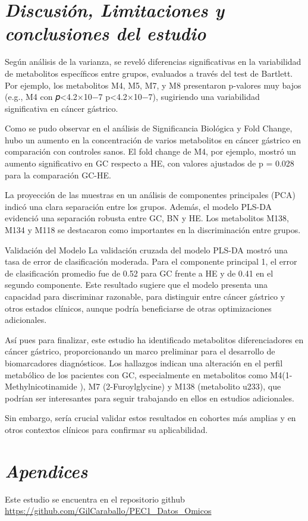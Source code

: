 \documentclass[
]{article}
\begin{document}
\section{\texorpdfstring{\emph{Discusión, Limitaciones y conclusiones
del
estudio}}{Discusión, Limitaciones y conclusiones del estudio}}\label{discusiuxf3n-limitaciones-y-conclusiones-del-estudio}

Según análisis de la varianza, se reveló diferencias significativas en
la variabilidad de metabolitos específicos entre grupos, evaluados a
través del test de Bartlett. Por ejemplo, los metabolitos M4, M5, M7, y
M8 presentaron p-valores muy bajos (e.g., M4 con 𝑝\textless4.2×10−7
p\textless4.2×10−7), sugiriendo una variabilidad significativa en cáncer
gástrico.

Como se pudo observar en el análisis de Significancia Biológica y Fold
Change, hubo un aumento en la concentración de varios metabolitos en
cáncer gástrico en comparación con controles sanos. El fold change de
M4, por ejemplo, mostró un aumento significativo en GC respecto a HE,
con valores ajustados de p = 0.028 para la comparación GC-HE.

La proyección de las muestras en un análisis de componentes principales
(PCA) indicó una clara separación entre los grupos. Además, el modelo
PLS-DA evidenció una separación robusta entre GC, BN y HE. Los
metabolitos M138, M134 y M118 se destacaron como importantes en la
discriminación entre grupos.

Validación del Modelo La validación cruzada del modelo PLS-DA mostró una
tasa de error de clasificación moderada. Para el componente principal 1,
el error de clasificación promedio fue de 0.52 para GC frente a HE y de
0.41 en el segundo componente. Este resultado sugiere que el modelo
presenta una capacidad para discriminar razonable, para distinguir entre
cáncer gástrico y otros estados clínicos, aunque podría beneficiarse de
otras optimizaciones adicionales.

Así pues para finalizar, este estudio ha identificado metabolitos
diferenciadores en cáncer gástrico, proporcionando un marco preliminar
para el desarrollo de biomarcadores diagnósticos. Los hallazgos indican
una alteración en el perfil metabólico de los pacientes con GC,
especialmente en metabolitos como M4(1-Methylnicotinamide ), M7
(2-Furoylglycine) y M138 (metabolito u233), que podrían ser interesantes
para seguir trabajando en ellos en estudios adicionales.

Sin embargo, sería crucial validar estos resultados en cohortes más
amplias y en otros contextos clínicos para confirmar su aplicabilidad.

\section{\texorpdfstring{\emph{Apendices}}{Apendices}}\label{apendices}

Este estudio se encuentra en el repositorio github
\url{https://github.com/GilCaraballo/PEC1_Datos_Omicos}
\end{document}
